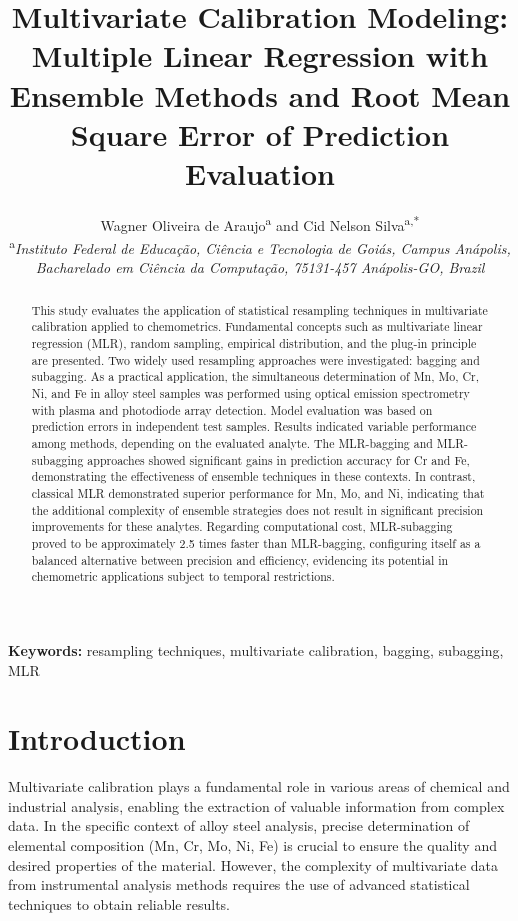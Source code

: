 \documentclass[12pt]{article}
\title{\textbf{Multivariate Calibration Modeling: Multiple Linear Regression with Ensemble Methods and Root Mean Square Error of Prediction Evaluation}}
\author{
Wagner Oliveira de Araujo\textsuperscript{a} and Cid Nelson Silva\textsuperscript{a,*}\\
\textsuperscript{a}\textit{Instituto Federal de Educação, Ciência e Tecnologia de Goiás, Campus Anápolis,}\\
\textit{Bacharelado em Ciência da Computação, 75131-457 Anápolis-GO, Brazil}
}
\date{}
\begin{document}
\maketitle

\begin{abstract}
This study evaluates the application of statistical resampling techniques in multivariate calibration applied to chemometrics. Fundamental concepts such as multivariate linear regression (MLR), random sampling, empirical distribution, and the plug-in principle are presented. Two widely used resampling approaches were investigated: bagging and subagging. As a practical application, the simultaneous determination of Mn, Mo, Cr, Ni, and Fe in alloy steel samples was performed using optical emission spectrometry with plasma and photodiode array detection. Model evaluation was based on prediction errors in independent test samples. Results indicated variable performance among methods, depending on the evaluated analyte. The MLR-bagging and MLR-subagging approaches showed significant gains in prediction accuracy for Cr and Fe, demonstrating the effectiveness of ensemble techniques in these contexts. In contrast, classical MLR demonstrated superior performance for Mn, Mo, and Ni, indicating that the additional complexity of ensemble strategies does not result in significant precision improvements for these analytes. Regarding computational cost, MLR-subagging proved to be approximately 2.5 times faster than MLR-bagging, configuring itself as a balanced alternative between precision and efficiency, evidencing its potential in chemometric applications subject to temporal restrictions.
\end{abstract}

\textbf{Keywords:} resampling techniques, multivariate calibration, bagging, subagging, MLR

\section{Introduction}

Multivariate calibration plays a fundamental role in various areas of chemical and industrial analysis, enabling the extraction of valuable information from complex data. In the specific context of alloy steel analysis, precise determination of elemental composition (Mn, Cr, Mo, Ni, Fe) is crucial to ensure the quality and desired properties of the material. However, the complexity of multivariate data from instrumental analysis methods requires the use of advanced statistical techniques to obtain reliable results.\cite{Ewing:1972,Harley:1954,Skoog:1997}
\end{document}
